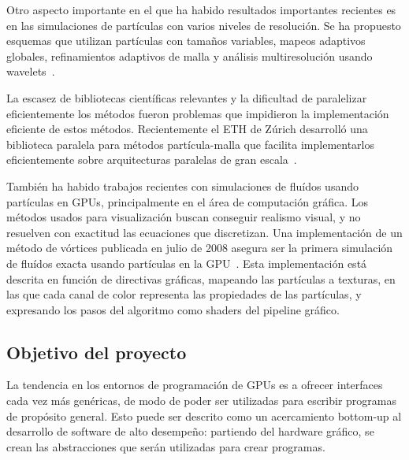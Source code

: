 \documentclass[11pt,spanish]{article}
\newcommand{\vel}{\mathbf{u}}
\newcommand{\vort}{\mathbf{\omega}}
\begin{document}
Otro aspecto importante en el que ha habido resultados importantes recientes es
en las simulaciones de partículas con varios niveles de resolución.
Se ha propuesto esquemas que utilizan
partículas con tamaños variables,
mapeos adaptivos globales,
refinamientos adaptivos de malla
y análisis multiresolución usando wavelets~\cite{multiresolution}.

La escasez de bibliotecas científicas relevantes y la dificultad de paralelizar
eficientemente los métodos fueron problemas que impidieron la implementación
eficiente de estos métodos.  Recientemente el ETH de Zúrich desarrolló una
biblioteca paralela para métodos partícula-malla que facilita implementarlos
eficientemente sobre arquitecturas paralelas de gran escala~\cite{ppm}.

También ha habido trabajos recientes con simulaciones de fluídos usando partículas
en GPUs, principalmente en el área de computación gráfica.  Los métodos usados
para visualización buscan conseguir realismo visual, y no resuelven con
exactitud las ecuaciones que discretizan.  Una implementación de un método de
vórtices publicada en julio de 2008 asegura ser la primera simulación de fluídos
exacta usando partículas en la GPU~\cite{vortex-gpu}.  Esta implementación está
descrita en función de directivas gráficas, mapeando las partículas a texturas,
en las que cada canal de color representa las propiedades de las partículas, y
expresando los pasos del algoritmo como shaders del pipeline gráfico.



\subsection{Objetivo del proyecto}



La tendencia en los entornos de programación de GPUs es a ofrecer interfaces
cada vez más genéricas, de modo de poder ser utilizadas para escribir programas
de propósito general.  Esto puede ser descrito como un acercamiento bottom-up
al desarrollo de software de alto desempeño:  partiendo del hardware gráfico,
se crean las abstracciones que serán utilizadas para crear programas.
\end{document}
